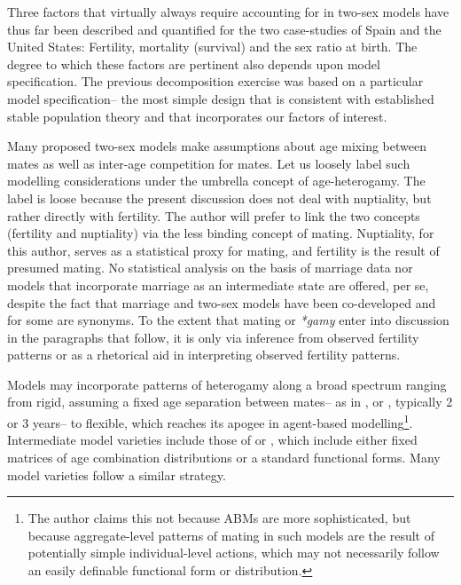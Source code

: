 \FloatBarrier
Three factors that virtually always require accounting for in two-sex models
have thus far been described and quantified for the two case-studies of Spain and
the United States: Fertility, mortality (survival) and the sex ratio at birth.
The degree to which these factors are pertinent also depends upon model 
specification. The previous decomposition exercise was based on a particular
model specification-- the most simple design that is consistent with
established stable population theory and that incorporates our factors of
interest. 

Many proposed two-sex models make assumptions about age mixing between
mates as well as inter-age competition for mates. Let us loosely 
label such modelling considerations under the umbrella concept of
age-heterogamy. The label is loose because the present
discussion does not deal with nuptiality, but rather directly with fertility.
The author will prefer to link the two concepts (fertility and nuptiality) via
the less binding concept of mating. Nuptiality, for this author, serves as a
statistical proxy for mating, and fertility is the result of presumed mating. No 
statistical analysis on the basis of
marriage data nor models that incorporate marriage as an intermediate state are
offered, per se, despite the fact that marriage and two-sex models have
been co-developed and for some are synonyms. To the extent that mating or
\textit{*gamy} enter into discussion in the paragraphs that follow, it is only
via inference from observed fertility patterns or as a rhetorical aid in interpreting observed fertility patterns.

Models may incorporate patterns of heterogamy along a
broad spectrum ranging from rigid, assuming a fixed age separation between mates--
 as in \citet{cabre1997tortulos}, \citet{karmel1947relations} or \citet{akers1967measuring}, 
 typically 2 or 3 years-- to flexible, which reaches its apogee in agent-based
modelling\footnote{The author claims this not because ABMs are more
sophisticated, but because aggregate-level patterns of mating in such models are
the result of potentially simple individual-level actions, which may not
necessarily follow an easily definable functional form or distribution.}.
Intermediate model varieties include those of \citet[e.g.]{gupta1972two} or
\citet{schoen1981harmonic}, which include either fixed matrices of age
combination distributions or a standard functional forms. Many model varieties
follow a similar strategy.  

